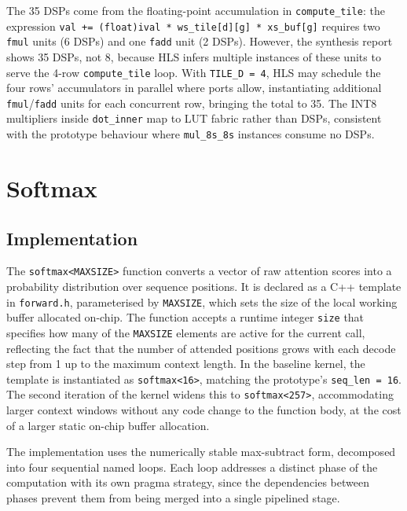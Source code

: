The 35 DSPs come from the floating-point accumulation in
\texttt{compute\_tile}: the expression \texttt{val += (float)ival *
ws\_tile[d][g] * xs\_buf[g]} requires two \texttt{fmul} units (6 DSPs)
and one \texttt{fadd} unit (2 DSPs). However, the synthesis report shows
35 DSPs, not 8, because HLS infers multiple instances of these units to
serve the 4-row \texttt{compute\_tile} loop. With \texttt{TILE\_D\,=\,4},
HLS may schedule the four rows' accumulators in parallel where ports
allow, instantiating additional \texttt{fmul}/\texttt{fadd} units for
each concurrent row, bringing the total to 35. The INT8 multipliers
inside \texttt{dot\_inner} map to LUT fabric rather than DSPs, consistent
with the prototype behaviour where \texttt{mul\_8s\_8s} instances consume
no DSPs.



\section{Softmax}
\label{sec:softmax_impl}

\subsection{Implementation}
\label{subsec:softmax_impl}

The \texttt{softmax<MAXSIZE>} function converts a vector of raw attention
scores into a probability distribution over sequence positions. It is
declared as a C++ template in \texttt{forward.h}, parameterised by
\texttt{MAXSIZE}, which sets the size of the local working buffer
allocated on-chip. The function accepts a runtime integer \texttt{size}
that specifies how many of the \texttt{MAXSIZE} elements are active for
the current call, reflecting the fact that the number of attended
positions grows with each decode step from 1 up to the maximum context
length. In the baseline kernel, the template is instantiated as
\texttt{softmax<16>}, matching the prototype's \texttt{seq\_len = 16}.
The second iteration of the kernel widens this to
\texttt{softmax<257>}, accommodating larger context windows without
any code change to the function body, at the cost of a larger static
on-chip buffer allocation.

The implementation uses the numerically stable max-subtract form,
decomposed into four sequential named loops. Each loop addresses a
distinct phase of the computation with its own pragma strategy, since
the dependencies between phases prevent them from being merged into a
single pipelined stage.

